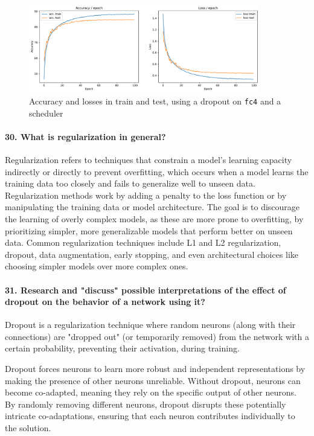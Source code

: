 \begin{figure}[H]
    \centering
    \includegraphics*[width=0.9\textwidth]{figs/CNN/dropout_with_scheduler.pdf}
    \caption{Accuracy and losses in train and test, using a dropout on \texttt{fc4} and a scheduler}
    \label{fig:dropout_with_scheduler}
\end{figure}

\paragraph{30. What is regularization in general?}
Regularization refers to techniques that constrain a model's learning capacity indirectly or directly to prevent overfitting, which occurs when a model learns the training data too closely and fails to generalize well to unseen data. Regularization methods work by adding a penalty to the loss function or by manipulating the training data or model architecture. The goal is to discourage the learning of overly complex models, as these are more prone to overfitting, by prioritizing simpler, more generalizable models that perform better on unseen data. Common regularization techniques include L1 and L2 regularization, dropout, data augmentation, early stopping, and even architectural choices like choosing simpler models over more complex ones.

\paragraph{31. Research and "discuss" possible interpretations of the effect of dropout on the behavior of a network using it?}
Dropout is a regularization technique where random neurons (along with their connections) are "dropped out" (or temporarily removed) from the network with a certain probability, preventing their activation, during training.

Dropout forces neurons to learn more robust and independent representations by making the presence of other neurons unreliable. Without dropout, neurons can become co-adapted, meaning they rely on the specific output of other neurons. By randomly removing different neurons, dropout disrupts these potentially intricate co-adaptations, ensuring that each neuron contributes individually to the solution.

